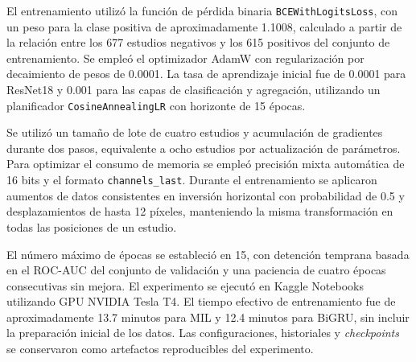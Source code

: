 El entrenamiento utilizó la función de pérdida binaria \texttt{BCEWithLogitsLoss}, con un peso para la clase positiva de aproximadamente 1.1008, calculado a partir de la relación entre los 677 estudios negativos y los 615 positivos del conjunto de entrenamiento. Se empleó el optimizador AdamW con regularización por decaimiento de pesos de 0.0001. La tasa de aprendizaje inicial fue de 0.0001 para ResNet18 y 0.001 para las capas de clasificación y agregación, utilizando un planificador \texttt{CosineAnnealingLR} con horizonte de 15 épocas.

Se utilizó un tamaño de lote de cuatro estudios y acumulación de gradientes durante dos pasos, equivalente a ocho estudios por actualización de parámetros. Para optimizar el consumo de memoria se empleó precisión mixta automática de 16 bits y el formato \texttt{channels\_last}. Durante el entrenamiento se aplicaron aumentos de datos consistentes en inversión horizontal con probabilidad de 0.5 y desplazamientos de hasta 12 píxeles, manteniendo la misma transformación en todas las posiciones de un estudio.

El número máximo de épocas se estableció en 15, con detención temprana basada en el ROC-AUC del conjunto de validación y una paciencia de cuatro épocas consecutivas sin mejora. El experimento se ejecutó en Kaggle Notebooks utilizando GPU NVIDIA Tesla T4. El tiempo efectivo de entrenamiento fue de aproximadamente 13.7 minutos para MIL y 12.4 minutos para BiGRU, sin incluir la preparación inicial de los datos. Las configuraciones, historiales y \textit{checkpoints} se conservaron como artefactos reproducibles del experimento.